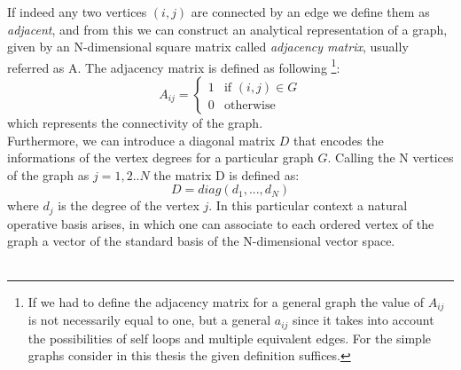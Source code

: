 \noindent
If indeed any two vertices $(i,j)$ are connected by an edge we define them as \textit{adjacent}, and from this we can construct an analytical representation of a graph, given by an N-dimensional square matrix called \textit{adjacency matrix}, usually referred as A. The adjacency matrix is defined as following \footnote{If we had to define the adjacency matrix for a general graph the value of $A_{ij}$ is not necessarily equal to one, but a general $a_{ij}$ since it takes into account the possibilities of self loops and multiple equivalent edges. For the simple graphs consider in this thesis the given definition suffices.}:
\begin{equation}
A_{ij} = \begin{cases} 1 & \mbox{if }(i,j)\in G \\ 0 & \mbox{otherwise} \end{cases}
\end{equation}
which represents the connectivity of the graph. \\
Furthermore, we can introduce a diagonal matrix $D$ that encodes the informations of the vertex degrees for a particular graph $G$. Calling the N vertices of the graph as $j=1,2..N$ the matrix D is defined as:
\begin{equation}
    D = diag(d_1,..., d_N)
\end{equation}
where $d_j$ is the degree of the vertex $j$.
In this particular context a natural operative basis arises, in which one can associate to each ordered vertex of the graph a vector of the standard basis of the N-dimensional vector space. \\ \\


